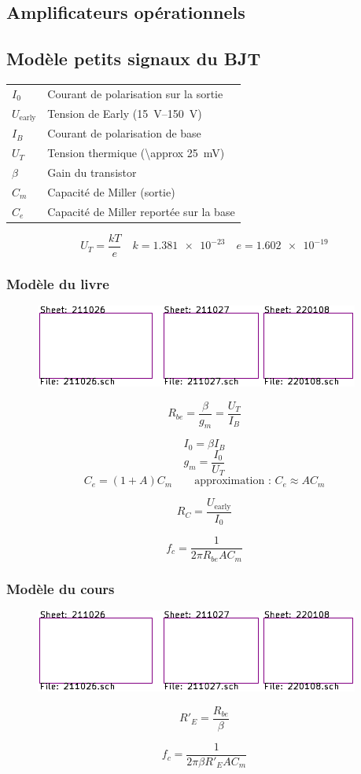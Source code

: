 \documentclass[resume]{subfiles}
\begin{document}
\begin{multicols}{3}
\section{Amplificateurs opérationnels}

\subsection{Modèle petits signaux du BJT}
\begin{center}
\begin{tabular}{ll}
$I_0$ & Courant de polarisation sur la sortie\\
$U_{\text{early}}$ & Tension de Early (\SIrange{15}{150}{\volt})\\
$I_B$ & Courant de polarisation de base\\
$U_T$ & Tension thermique (\SI{\approx 25}{\milli\volt})\\
$\beta$ & Gain du transistor\\
$C_m$ & Capacité de Miller (sortie)\\
$C_e$ & Capacité de Miller reportée sur la base
\end{tabular}
\end{center}
$$U_T=\frac{kT}{e}\quad k=\num{1.381e-23}\quad e=\num{1.602e-19}$$
\subsubsection{Modèle du livre}
\begin{figure}[H]
\centering
\includegraphics[scale=1,page=9]{../KiCad/resume-crop.pdf}
\end{figure}


$$R_{be}=\frac{\beta}{g_m}=\frac{U_T}{I_B}$$

$$I_0=\beta I_B$$
$$g_m=\frac{I_0}{U_T}$$
$$C_e=(1+A)C_m\qquad \text{approximation : } C_e\approx AC_m$$

$$R_C=\frac{U_{\text{early}}}{I_0}$$


$$f_c=\frac{1}{2\pi R_{be} A C_m}$$
\subsubsection{Modèle du cours}
\begin{figure}[H]
\centering
\includegraphics[scale=1,page=10]{../KiCad/resume-crop.pdf}
\end{figure}
$$R'_E=\frac{R_{be}}{\beta}$$

$$f_c=\frac{1}{2\pi \beta R'_E A C_m}$$


\end{multicols}
\end{document}
